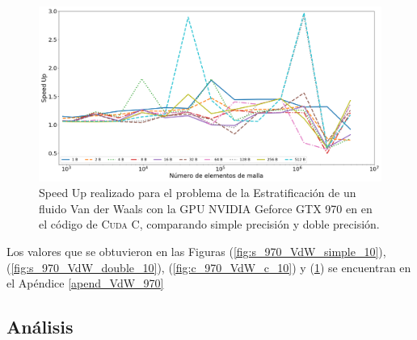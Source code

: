 \begin{figure}[htbp]
	\centering
	\includegraphics[width=\textwidth]{figs/cap4/c_970_VdW_cuda_10}
	\caption{Speed Up realizado para el problema de la Estratificación de un fluido Van der Waals con la GPU NVIDIA Geforce GTX 970 en en el código de \textsc{Cuda C}, comparando simple precisión y doble precisión.} 
	\label{fig:c_970_VdW_cuda_10}	
\end{figure}

Los valores que se obtuvieron en las Figuras (\ref{fig:s_970_VdW_simple_10}), (\ref{fig:s_970_VdW_double_10}), (\ref{fig:c_970_VdW_c_10}) y (\ref{fig:c_970_VdW_cuda_10}) se encuentran en el Apéndice \ref{apend_VdW_970}

\subsection{Análisis}



\newpage



